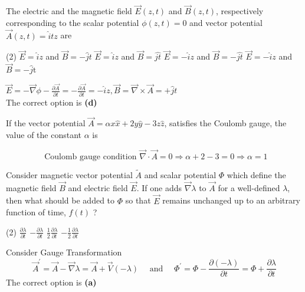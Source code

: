 \begin{enumerate}
	\begin{minipage}{\textwidth}
		\item  The electric and the magnetic field $\vec{E}(z, t)$ and $\vec{B}(z, t)$, respectively corresponding to the scalar potential $\phi(z, t)=0$ and vector potential $\vec{A}(z, t)=\hat{i} t z$ are
	\end{minipage}
	\begin{tasks}(2)
		\task[\textbf{A.}] $\vec{E}=\hat{i} z$ and $\vec{B}=-\hat{j} t$
		\task[\textbf{B.}]$\vec{E}=\hat{i} z$ and $\vec{B}=\hat{j t}$
		\task[\textbf{C.}]$\vec{E}=-\hat{i} z$ and $\vec{B}=-\hat{j t}$
		\task[\textbf{D.}]$\vec{E}=-\hat{i} z$ and $\vec{B}=-\hat{j} \mathrm{t}$
	\end{tasks}
\begin{answer}
	$\vec{E}=-\vec{\nabla} \phi-\frac{\partial \vec{A}}{\partial t}=-\frac{\partial \vec{A}}{\partial t}=-\hat{i} z, \vec{B}=\vec{\nabla} \times \vec{A}=+\hat{j} t$\\
The correct option is \textbf{(d)}
\end{answer}
\begin{minipage}{\textwidth}
	\item If the vector potential $\vec{A}=\alpha x \hat{x}+2 y \hat{y}-3 z \hat{z}$, satisfies the Coulomb gauge, the value of the constant $\alpha$ is
\end{minipage}
\begin{answer}
$$\text { Coulomb gauge condition } \vec{\nabla} \cdot \vec{A}=0 \Rightarrow \alpha+2-3=0 \Rightarrow \alpha=1$$	
\end{answer}
\begin{minipage}{\textwidth}
	\item Consider magnetic vector potential $\tilde{A}$ and scalar potential $\Phi$ which define the magnetic field $\vec{B}$ and electric field $\vec{E}$. If one adds $\vec{\nabla} \lambda$ to $\vec{A}$ for a well-defined $\lambda$, then what should be added to $\Phi$ so that $\vec{E}$ remains unchanged up to an arbitrary function of time, $f(t)$ ?
\end{minipage}
\begin{tasks}(2)
	\task[\textbf{A.}] $\frac{\partial \lambda}{\partial t}$
	\task[\textbf{B.}]$-\frac{\partial \lambda}{\partial t}$
	\task[\textbf{C.}]$\frac{1}{2} \frac{\partial \lambda}{\partial t}$
	\task[\textbf{D.}]$-\frac{1}{2} \frac{\partial \lambda}{\partial t}$
\end{tasks}
\begin{answer}
Consider Gauge Transformation
$$
\vec{A}^{\prime}=\vec{A}-\vec{\nabla} \lambda=\vec{A}+\vec{V}(-\lambda) \quad \text { and } \quad \Phi^{\prime}=\Phi-\frac{\partial(-\lambda)}{\partial t}=\Phi+\frac{\partial \lambda}{\partial t}
$$
The correct option is \textbf{(a)}	
\end{answer}
\end{enumerate}






























